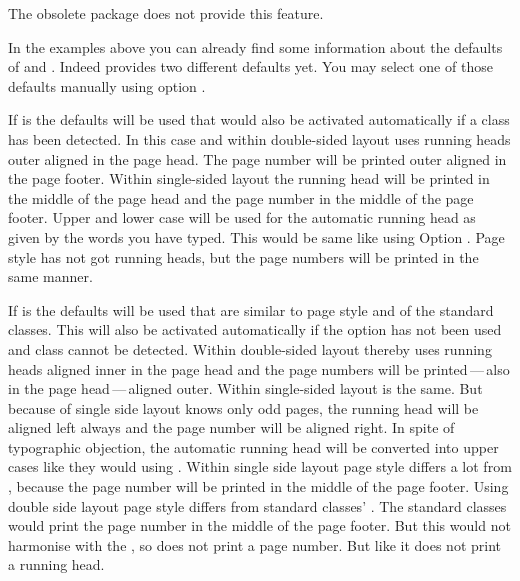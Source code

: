 The obsolete package  does not
provide this feature.%
%
\EndIndexGroup


\begin{Declaration}
\end{Declaration}
%
In the examples above you can already find some information about the defaults
of  and
. Indeed
 provides two different defaults yet. You may select
one of those defaults manually using option .

If  is  the defaults will be used that
would also be activated automatically if a \KOMAScript{} class has been
detected. In this case and within double-sided layout 
uses running heads outer aligned in the page head. The page number will be
printed outer aligned in the page footer. Within single-sided layout the
running head will be printed in the middle of the page head and the page
number in the middle of the page footer. Upper and lower case will be used for
the automatic running head as given by the words you have typed. This would be
same like using Option
.
Page style  has not got running heads, but the
page numbers will be printed in the same manner.

If  is  the defaults will be used that are
similar to page style  and  of the
standard classes. This  will also be activated automatically if
the option has not been used and \KOMAScript{} class cannot be
detected. Within double-sided layout thereby  uses
running heads aligned inner in the page head and the page numbers will be
printed\,---\,also in the page head\,---\,aligned outer. Within single-sided
layout  is the same. But because of single side layout
knows only odd pages, the running head will be aligned left always and the
page number will be aligned right. In spite of typographic objection, the
automatic running head will be converted into upper cases like they would
using
.
Within single side layout page style  differs a
lot from , because the page number will be printed in
the middle of the page footer. Using double side layout page style
 differs from standard classes'
. The standard classes would print the page number in the
middle of the page footer. But this would not harmonise with the
, so  does not print a
page number. But like  it does not print a running head.


